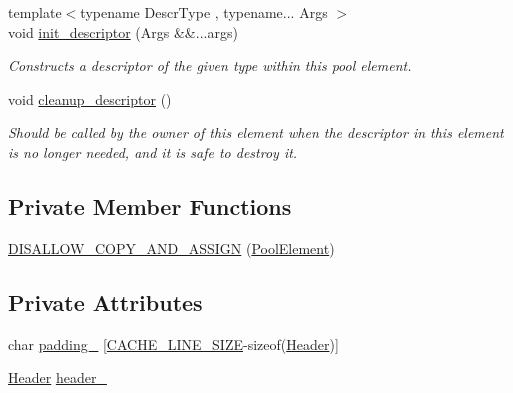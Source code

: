 \begin{DoxyCompactItemize}
{\footnotesize template$<$typename Descr\+Type , typename... Args $>$ }\\void \hyperlink{classtervel_1_1util_1_1memory_1_1rc_1_1_pool_element_a331f2b0a6a0ebf2db58c0ba81a34db45}{init\+\_\+descriptor} (Args \&\&...args)
\begin{DoxyCompactList}\small\item\em Constructs a descriptor of the given type within this pool element. \end{DoxyCompactList}\item 
void \hyperlink{classtervel_1_1util_1_1memory_1_1rc_1_1_pool_element_add6f9c64f13202b97797dc12c4bc3dd8}{cleanup\+\_\+descriptor} ()
\begin{DoxyCompactList}\small\item\em Should be called by the owner of this element when the descriptor in this element is no longer needed, and it is safe to destroy it. \end{DoxyCompactList}\end{DoxyCompactItemize}
\subsection*{Private Member Functions}
\begin{DoxyCompactItemize}
\item 
\hyperlink{classtervel_1_1util_1_1memory_1_1rc_1_1_pool_element_a4080376010aab52b5454440ec4537b47}{D\+I\+S\+A\+L\+L\+O\+W\+\_\+\+C\+O\+P\+Y\+\_\+\+A\+N\+D\+\_\+\+A\+S\+S\+I\+G\+N} (\hyperlink{classtervel_1_1util_1_1memory_1_1rc_1_1_pool_element}{Pool\+Element})
\end{DoxyCompactItemize}
\subsection*{Private Attributes}
\begin{DoxyCompactItemize}
\item 
char \hyperlink{classtervel_1_1util_1_1memory_1_1rc_1_1_pool_element_ab97d48ce3cb545bcb970e602f9ddaaa4}{padding\+\_\+} \mbox{[}\hyperlink{system_8h_af89f60b07247176687889ade776c8e10}{C\+A\+C\+H\+E\+\_\+\+L\+I\+N\+E\+\_\+\+S\+I\+Z\+E}-\/sizeof(\hyperlink{structtervel_1_1util_1_1memory_1_1rc_1_1_pool_element_1_1_header}{Header})\mbox{]}
\item 
\hyperlink{structtervel_1_1util_1_1memory_1_1rc_1_1_pool_element_1_1_header}{Header} \hyperlink{classtervel_1_1util_1_1memory_1_1rc_1_1_pool_element_aaa6ba2c75f70b0f717a5df1dfee1c811}{header\+\_\+}
\end{DoxyCompactItemize}


